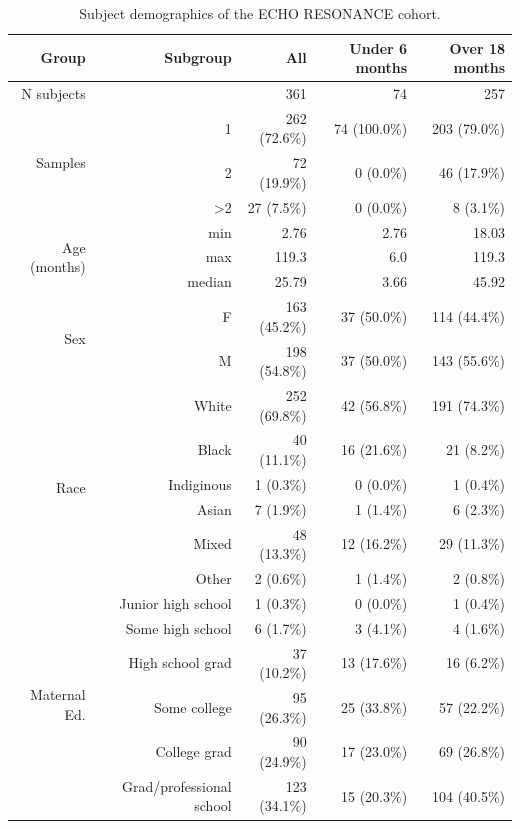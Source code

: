 \documentclass{article}
\begin{document}
\begin{table}[!h]
    \centering
    \begin{tabular}{|r|r|r|r|r|}
      \hline\hline
      \textbf{Group} & \textbf{Subgroup} & \textbf{All} & \textbf{Under 6 months} & \textbf{Over 18 months} \\\hline
      N subjects &  & 361 & 74 & 257 \\  \hline
    \multirow{3}{*}{Samples} & 1 & 262 (72.6\%) & 74 (100.0\%) & 203 (79.0\%) \\ \cline{2-5}
         & 2 & 72 (19.9\%) & 0 (0.0\%) & 46 (17.9\%) \\ \cline{2-5}
         & \textgreater 2 & 27 (7.5\%) & 0 (0.0\%) & 8 (3.1\%) \\ \hline
    \multirow{3}{*}{Age (months)} & min & 2.76 & 2.76 & 18.03 \\ \cline{2-5}
         & max & 119.3 & 6.0 & 119.3 \\ \cline{2-5}
         & median & 25.79 & 3.66 & 45.92 \\ \hline
    \multirow{2}{*}{Sex} & F & 163 (45.2\%) & 37 (50.0\%) & 114 (44.4\%) \\   \cline{2-5}
                         & M & 198 (54.8\%) & 37 (50.0\%) & 143 (55.6\%) \\  \hline
    \multirow{6}{*}{Race} & White & 252 (69.8\%) & 42 (56.8\%) & 191 (74.3\%) \\   \cline{2-5}
        & Black & 40 (11.1\%) & 16 (21.6\%) & 21 (8.2\%) \\ \cline{2-5}
        & Indiginous & 1 (0.3\%) & 0 (0.0\%) & 1 (0.4\%) \\ \cline{2-5}
        & Asian & 7 (1.9\%) & 1 (1.4\%) & 6 (2.3\%) \\ \cline{2-5}
        & Mixed & 48 (13.3\%) & 12 (16.2\%) & 29 (11.3\%) \\ \cline{2-5}
        & Other & 2 (0.6\%) & 1 (1.4\%) & 2 (0.8\%) \\ \hline
    \multirow{6}{*}{Maternal Ed.} & Junior high school & 1 (0.3\%) & 0 (0.0\%) & 1 (0.4\%) \\   \cline{2-5}
        & Some high school & 6 (1.7\%) & 3 (4.1\%) & 4 (1.6\%) \\ \cline{2-5}
        & High school grad & 37 (10.2\%) & 13 (17.6\%) & 16 (6.2\%) \\ \cline{2-5}
        & Some college & 95 (26.3\%) & 25 (33.8\%) & 57 (22.2\%) \\ \cline{2-5}
        & College grad & 90 (24.9\%) & 17 (23.0\%) & 69 (26.8\%) \\ \cline{2-5}
        & Grad/professional school & 123 (34.1\%) & 15 (20.3\%) & 104 (40.5\%) \\\hline\hline
    \end{tabular}
    \caption{\label{tab:demo}Subject demographics of the ECHO RESONANCE cohort.}
\end{table}
\end{document}
